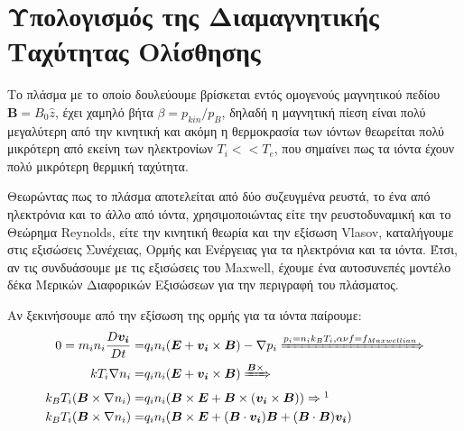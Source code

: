 \documentclass[a4paper]{article}
\begin{document}
	\section*{Υπολογισμός της Διαμαγνητικής Ταχύτητας Ολίσθησης}
 
	Το πλάσμα με το οποίο δουλεύουμε βρίσκεται εντός ομογενούς μαγνητικού πεδίου $\textbf{B}=B_0\hat{z}$, έχει χαμηλό βήτα $\beta=p_{kin}/p_{B}$, δηλαδή η μαγνητική πίεση είναι πολύ μεγαλύτερη από την κινητική και ακόμη η θερμοκρασία των ιόντων θεωρείται πολύ μικρότερη από εκείνη των ηλεκτρονίων $T_i<<T_e$, που σημαίνει πως τα ιόντα έχουν πολύ μικρότερη θερμική ταχύτητα.
	
	Θεωρώντας πως το πλάσμα αποτελείται από δύο συζευγμένα ρευστά, το ένα από ηλεκτρόνια και το άλλο από ιόντα, χρησιμοποιώντας είτε την ρευστοδυναμική και το Θεώρημα Reynolds, είτε την κινητική θεωρία και την εξίσωση Vlasov, καταλήγουμε στις εξισώσεις Συνέχειας, Ορμής και Ενέργειας για τα ηλεκτρόνια και τα ιόντα. 
	Έτσι, αν τις συνδυάσουμε με τις εξισώσεις του Maxwell, έχουμε ένα αυτοσυνεπές μοντέλο δέκα Μερικών Διαφορικών Εξισώσεων για την περιγραφή του πλάσματος.

	Αν ξεκινήσουμε από την εξίσωση της ορμής για τα ιόντα παίρουμε: 
		\begin{align*}
			0 = m_in_i \frac{D \bm{v_i} }{Dt} =& q_in_i(\bm{E} + \bm{v_i}\times\bm{B})-\nabla p_i \xRightarrow{p_i = n_ik_BT_i,\alpha\nu f=f_{Maxwellian}}\\
			kT_i\nabla n_i =& q_in_i(\bm{E} + \bm{v_i}\times\bm{B}) \xRightarrow{\bm{B}\times} \\
			k_BT_i (\bm{B}\times\nabla n_i) =& q_in_i(\bm{B}\times\bm{E} + \bm{B}\times(\bm{v_i}\times\bm{B}))\Rightarrow\footnotemark\\ 
			k_BT_i (\bm{B}\times\nabla n_i) =& q_in_i(\bm{B}\times\bm{E} + (\bm{B}\cdot\bm{v_i})\bm{B} + (\bm{B}\cdot\bm{B})\bm{v_i})\\
		\end{align*}
		
\end{document}
